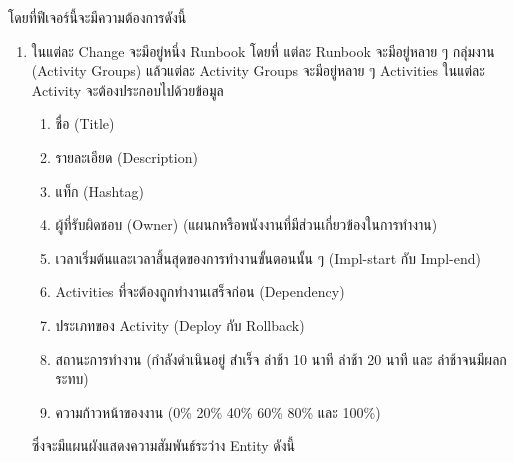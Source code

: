 โดยที่ฟีเจอร์นี้จะมีความต้องการดังนี้
\begin{enumerate}
    \item ในแต่ละ Change จะมีอยู่หนึ่ง Runbook โดยที่ แต่ละ Runbook จะมีอยู่หลาย ๆ กลุ่มงาน (Activity Groups) แล้วแต่ละ Activity Groups จะมีอยู่หลาย ๆ Activities ในแต่ละ Activity จะต้องประกอบไปด้วยข้อมูล 
    \begin{enumerate}
        \item ชื่อ (Title)
        \item รายละเอียด (Description) 
        \item แท็ก (Hashtag)
        \item ผู้ที่รับผิดชอบ (Owner) (แผนกหรือพนังงานที่มีส่วนเกี่ยวข้องในการทำงาน)
        \item เวลาเริ่มต้นและเวลาสิ้นสุดของการทำงานขั้นตอนนั้น ๆ (Impl-start กับ Impl-end)
        \item Activities ที่จะต้องถูกทำงานเสร็จก่อน (Dependency)
        \item ประเภทของ Activity (Deploy กับ Rollback)
        \item สถานะการทำงาน (กำลังดำเนินอยู่ สำเร็จ ล่าช้า 10 นาที ล่าช้า 20 นาที และ ล่าช้าจนมีผลกระทบ)
        \item ความก้าวหน้าของงาน (0\% 20\% 40\% 60\% 80\% และ 100\%)
    \end{enumerate}
    ซึ่งจะมีแผนผังแสดงความสัมพันธ์ระว่าง Entity ดังนี้
    \begin{figure}
        \begin{center}
\end{center}
\end{figure}
\end{enumerate}
